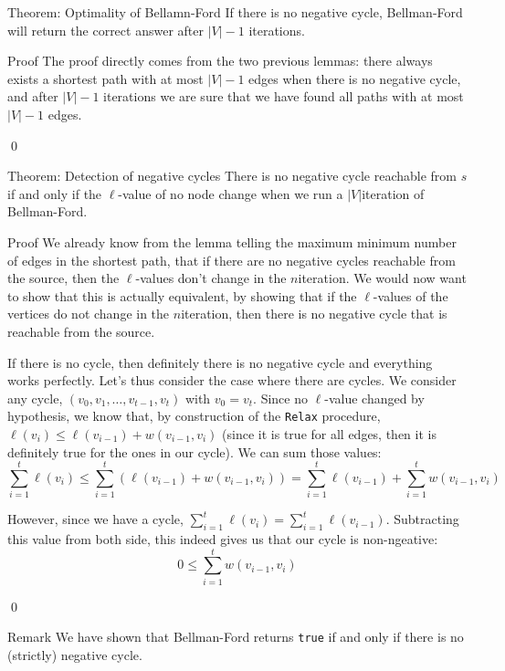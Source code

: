 \documentclass[a4paper]{article}
\begin{document}
\begin{parag}{Theorem: Optimality of Bellamn-Ford}
    If there is no negative cycle, Bellman-Ford will return the correct answer after $\left|V\right| - 1$ iterations.

    \begin{subparag}{Proof}
        The proof directly comes from the two previous lemmas: there always exists a shortest path with at most $\left|V\right| - 1$ edges when there is no negative cycle, and after $\left|V\right| - 1$ iterations we are sure that we have found all paths with at most $\left|V\right| - 1$ edges.

        \qed
    \end{subparag}
\end{parag}


\begin{parag}{Theorem: Detection of negative cycles}
    There is no negative cycle reachable from $s$ if and only if the $\ell $-value of no node change when we run a $\left|V\right|$\Th iteration of Bellman-Ford.

    \begin{subparag}{Proof}
        We already know from the lemma telling the maximum minimum number of edges in the shortest path, that if there are no negative cycles reachable from the source, then the $\ell $-values don't change in the $n$\Th iteration. We would now want to show that this is actually equivalent, by showing that if the $\ell $-values of the vertices do not change in the $n$\Th iteration, then there is no negative cycle that is reachable from the source. 

        If there is no cycle, then definitely there is no negative cycle and everything works perfectly. Let's thus consider the case where there are cycles. We consider any cycle, $\left(v_0, v_1, \ldots, v_{t-1}, v_t\right)$ with $v_0 = v_t$. Since no $\ell $-value changed by hypothesis, we know that, by construction of the \texttt{Relax} procedure, $\ell \left(v_i\right) \leq \ell \left(v_{i-1}\right) + w\left(v_{i- 1}, v_i\right)$ (since it is true for all edges, then it is definitely true for the ones in our cycle). We can sum those values: 
        \[\sum_{i=1}^{t} \ell \left(v_i\right) \leq \sum_{i=1}^{t} \left(\ell \left(v_{i-1}\right) + w\left(v_{i-1}, v_i\right)\right) = \sum_{i=1}^{t} \ell \left(v_{i-1}\right) + \sum_{i=1}^{t} w\left(v_{i-1}, v_i\right)\]
        
        However, since we have a cycle, $\sum_{i=1}^{t} \ell \left(v_i\right) = \sum_{i=1}^{t} \ell \left(v_{i-1}\right)$. Subtracting this value from both side, this indeed gives us that our cycle is non-ngeative: 
        \[0 \leq \sum_{i=1}^{t} w\left(v_{i-1}, v_i\right)\]

        \qed
    \end{subparag}

    \begin{subparag}{Remark}
        We have shown that Bellman-Ford returns \texttt{true} if and only if there is no (strictly) negative cycle.
    \end{subparag}
    
\end{parag}
\end{document}
